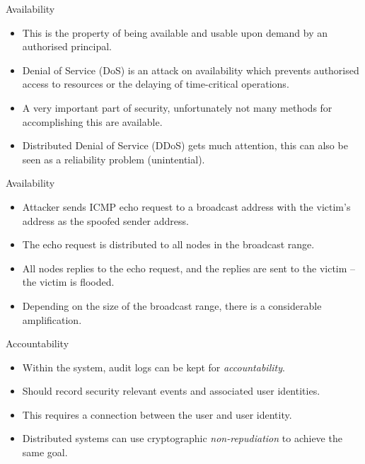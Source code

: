 \documentclass{beamer}
\begin{document}
\begin{frame}{\insertsubsectionhead}{Availability}
  \begin{itemize}
    \item This is the property of being available and usable upon demand by an 
      authorised principal.

    \item Denial of Service (DoS) is an attack on availability which prevents 
      authorised access to resources or the delaying of time-critical 
      operations.

    \item A very important part of security, unfortunately not many methods for 
      accomplishing this are available.

    \item Distributed Denial of Service (DDoS) gets much attention, this can 
      also be seen as a reliability problem (unintential).
  \end{itemize}
\end{frame}

\begin{frame}{\insertsubsectionhead}{Availability}
  \begin{example}
    \begin{itemize}
      \item Attacker sends ICMP echo request to a broadcast address with the 
        victim's address as the spoofed sender address.

      \item The echo request is distributed to all nodes in the broadcast 
        range.

      \item All nodes replies to the echo request, and the replies are sent to 
        the victim -- the victim is flooded.

      \item Depending on the size of the broadcast range, there is 
        a considerable amplification.
    \end{itemize}
  \end{example}
\end{frame}

\begin{frame}{\insertsubsectionhead}{Accountability}
  \begin{itemize}
    \item Within the system, audit logs can be kept for \emph{accountability}.

    \item Should record security relevant events and associated user 
      identities.

    \item This requires a connection between the user and user identity.

    \item Distributed systems can use cryptographic \emph{non-repudiation} to 
      achieve the same goal.
  \end{itemize}
\end{frame}
\end{document}
